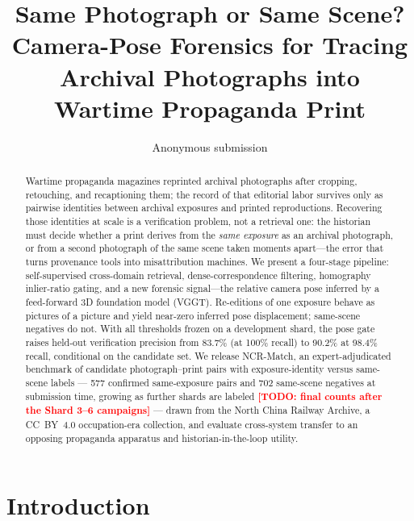 \documentclass[letterpaper]{article} %
\title{Same Photograph or Same Scene? Camera-Pose Forensics for Tracing Archival Photographs into Wartime Propaganda Print}
\author{Anonymous submission}
\newcommand{\todo}[1]{\textcolor{red}{\textbf{[TODO: #1]}}}
\begin{document}
\maketitle

\begin{abstract}
Wartime propaganda magazines reprinted archival photographs after cropping,
retouching, and recaptioning them; the record of that editorial labor survives
only as pairwise identities between archival exposures and printed
reproductions. Recovering those identities at scale is a verification problem,
not a retrieval one: the historian must decide whether a print derives from
the \emph{same exposure} as an archival photograph, or from a second
photograph of the same scene taken moments apart---the error that turns
provenance tools into misattribution machines. We present a four-stage
pipeline: self-supervised cross-domain retrieval, dense-correspondence
filtering, homography inlier-ratio gating, and a new forensic signal---the
relative camera pose inferred by a feed-forward 3D foundation model (VGGT).
Re-editions of one exposure behave as pictures of a picture and yield
near-zero inferred pose displacement; same-scene negatives do not. With all
thresholds frozen on a development shard, the pose gate raises held-out
verification precision from 83.7\% (at 100\% recall) to 90.2\% at 98.4\%
recall, conditional on the candidate set. We release NCR-Match, an
expert-adjudicated benchmark of candidate photograph--print pairs with
exposure-identity versus same-scene labels --- 577 confirmed same-exposure
pairs and 702 same-scene negatives at submission time, growing as further
shards are labeled \todo{final counts after the Shard 3--6 campaigns} ---
drawn from the North China Railway Archive, a CC~BY~4.0 occupation-era
collection, and evaluate cross-system transfer to an opposing propaganda
apparatus and historian-in-the-loop utility.
\end{abstract}

\section{Introduction}
\label{sec:intro}
\end{document}
